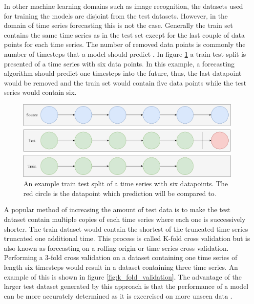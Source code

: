 In other machine learning domains such as image recognition, the datasets used for training the models are disjoint from the test datasets. However, in the domain of time series forecasting this is not the case. Generally the train set contains the same time series as in the test set except for the last couple of data points for each time series. The number of removed data points is commonly the number of timesteps that a model should predict \cite{hyndman_forecasting_3rd}. In figure \ref{fig:train_test_split} a train test split is presented of a time series with six data points. In this example, a forecasting algorithm should predict one timesteps into the future, thus, the last datapoint would be removed and the train set would contain five data points while the test series would contain six.

\begin{figure}[htb]
  \centering
  \includegraphics[width=\linewidth]{./img/train_test_split.png}
  \caption{An example train test split of a time series with six datapoints. The red circle is the datapoint which prediction will be compared to.}
  \label{fig:train_test_split}
  \endminipage\hfill
\end{figure}


A popular method of increasing the amount of test data is to make the test dataset contain multiple copies of each time series where each one is successively shorter. The train dataset would contain the shortest of the truncated time series truncated one additional time. This process is called K-fold cross validation but is also known as forecasting on a rolling origin or time series cross validation. Performing a 3-fold cross validation on a dataset containing one time series of length six timesteps would result in a dataset containing three time series. An example of this is shown in figure \ref{fig:k_fold_validation}. The advantage of the larger test dataset generated by this approach is that the performance of a model can be more accurately determined as it is excercised on more unseen data \cite{hyndman_forecasting_3rd}.

